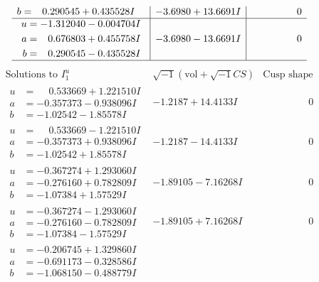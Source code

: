 \documentclass[1p]{elsarticle_modified}
\theoremstyle{definition}
\newcommand{\I}{\sqrt{-1}}
\begin{document}
$$\begin{array}{c|c|c}
\begin{aligned}
b &= \phantom{-}0.290545 + 0.435528 I\end{aligned}
 & -3.6980 + 13.6691 I & \phantom{-0.000000 } 0 \\ \hline\begin{aligned}
u &= -1.312040 - 0.004704 I \\
a &= \phantom{-}0.676803 + 0.455758 I \\
b &= \phantom{-}0.290545 - 0.435528 I\end{aligned}
 & -3.6980 - 13.6691 I & \phantom{-0.000000 } 0\\
 \hline 
 \end{array}$$\newpage$$\begin{array}{c|c|c}  
\text{Solutions to }I^u_{1}& \I (\text{vol} + \sqrt{-1}CS) & \text{Cusp shape}\\
 \hline 
\begin{aligned}
u &= \phantom{-}0.533669 + 1.221510 I \\
a &= -0.357373 - 0.938096 I \\
b &= -1.02542 - 1.85578 I\end{aligned}
 & -1.2187 + 14.4133 I & \phantom{-0.000000 } 0 \\ \hline\begin{aligned}
u &= \phantom{-}0.533669 - 1.221510 I \\
a &= -0.357373 + 0.938096 I \\
b &= -1.02542 + 1.85578 I\end{aligned}
 & -1.2187 - 14.4133 I & \phantom{-0.000000 } 0 \\ \hline\begin{aligned}
u &= -0.367274 + 1.293060 I \\
a &= -0.276160 + 0.782809 I \\
b &= -1.07384 + 1.57529 I\end{aligned}
 & -1.89105 - 7.16268 I & \phantom{-0.000000 } 0 \\ \hline\begin{aligned}
u &= -0.367274 - 1.293060 I \\
a &= -0.276160 - 0.782809 I \\
b &= -1.07384 - 1.57529 I\end{aligned}
 & -1.89105 + 7.16268 I & \phantom{-0.000000 } 0 \\ \hline\begin{aligned}
u &= -0.206745 + 1.329860 I \\
a &= -0.691173 - 0.328586 I \\
b &= -1.068150 - 0.488779 I\end{aligned}

\end{array}$$
\end{document}
